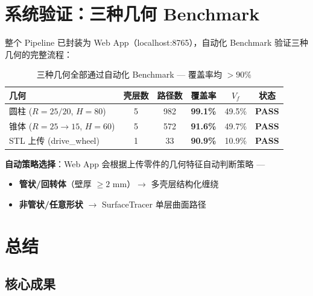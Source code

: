 \documentclass[11pt,a4paper]{article}
\begin{document}
\section{系统验证：三种几何 Benchmark}

整个 Pipeline 已封装为 Web App（localhost:8765），自动化 Benchmark 验证三种几何的完整流程：

\begin{table}[H]
\centering
\begin{tabularx}{\textwidth}{l c c c c c}
\toprule
\textbf{几何} & \textbf{壳层数} & \textbf{路径数} & \textbf{覆盖率} & $V_f$ & \textbf{状态} \\
\midrule
圆柱 ($R=25/20$, $H=80$) & 5 & 982 & \textcolor{pass}{\textbf{99.1\%}} & 49.5\% & \textcolor{pass}{\textbf{PASS}} \\
锥体 ($R=25 \to 15$, $H=60$) & 5 & 572 & \textcolor{pass}{\textbf{91.6\%}} & 49.7\% & \textcolor{pass}{\textbf{PASS}} \\
STL 上传 (drive\_wheel) & 1 & 33 & \textcolor{pass}{\textbf{90.9\%}} & 10.9\% & \textcolor{pass}{\textbf{PASS}} \\
\bottomrule
\end{tabularx}
\caption{三种几何全部通过自动化 Benchmark --- 覆盖率均 $> 90\%$}
\end{table}

\textbf{自动策略选择}：Web App 会根据上传零件的几何特征自动判断策略 ---
\begin{itemize}[nosep]
\item \textbf{管状/回转体}（壁厚 $\geq 2$ mm）$\to$ 多壳层结构化缠绕
\item \textbf{非管状/任意形状} $\to$ SurfaceTracer 单层曲面路径
\end{itemize}

\section{总结}

\subsection{核心成果}
\end{document}
